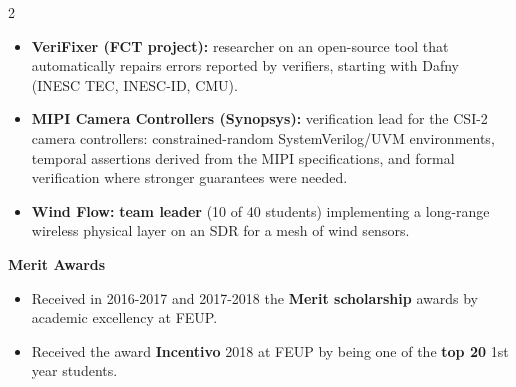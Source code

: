 \documentclass[10pt,a4paper,ragged2e,withhyper]{altacv}
\begin{document}
\begin{paracol}{2}
\begin{itemize}
 \item \textbf{VeriFixer (FCT project):} researcher on an open-source tool that automatically repairs errors reported by verifiers, starting with Dafny (INESC TEC, INESC-ID, CMU).

 \item \textbf{MIPI Camera Controllers (Synopsys):} verification lead for the CSI-2 camera controllers: constrained-random SystemVerilog/UVM environments, temporal assertions derived from the MIPI specifications, and formal verification where stronger guarantees were needed.

 \item \textbf{Wind Flow:} \textbf{team leader} (10 of 40 students) implementing a long-range wireless physical layer on an SDR for a mesh of wind sensors.
\end{itemize}

\switchcolumn



\textbf{Merit Awards}
\begin{itemize}
  \item Received in 2016-2017 and 2017-2018 the \textbf{Merit scholarship} awards by academic excellency at FEUP. 

    \item Received the award \textbf{Incentivo} 2018 at FEUP by being one of the \textbf{top 20} 1st year students.
\end{itemize}


    






\end{paracol}
\end{document}
